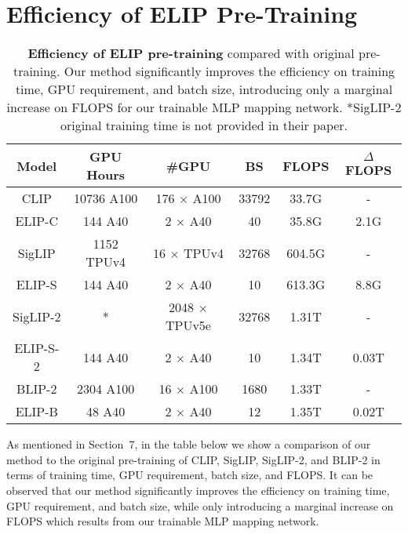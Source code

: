 \clearpage
\section{Efficiency of ELIP Pre-Training}
\label{sec:sup_efficiency}



\begin{table}[h]
    \centering
    \tabcolsep=0.7cm
    \begin{tabular}{cccccc}
    \toprule 
    Model & GPU Hours & \#GPU & BS & FLOPS & $\Delta$FLOPS \\
    \midrule

CLIP & 10736 A100 & 176 $\times$ A100 & 33792 &33.7G & -  \\
ELIP-C  & 144 A40 & 2 $\times$  A40 & 40 &35.8G & 2.1G \\
\midrule
SigLIP & 1152 TPUv4 & 16 $\times$ TPUv4 & 32768 & 604.5G & -    \\
ELIP-S & 144 A40 & 2 $\times$  A40 & 10 &613.3G & 8.8G   \\
\midrule
SigLIP-2 & * & 2048 $\times$ TPUv5e & 32768 &1.31T & -    \\
ELIP-S-2 & 144 A40 & 2 $\times$  A40 & 10 &1.34T &  0.03T   \\
\midrule
BLIP-2 & 2304 A100 & 16 $\times$  A100 & 1680 & 1.33T & -   \\
ELIP-B & 48 A40 & 2 $\times$ A40 & 12 &1.35T & 0.02T \\

    \bottomrule
    \end{tabular}
    \caption{\textbf{Efficiency of ELIP pre-training} compared with original pre-training. Our method significantly improves the efficiency on training time, GPU requirement, and batch size, introducing only a marginal increase on FLOPS for our trainable MLP mapping network. *SigLIP-2 original training time is not provided in their paper.}
    \label{tab:supple_efficiency}
\end{table}



As mentioned in Section~7, in the table below we show a comparison of our method to the original pre-training of CLIP, SigLIP, SigLIP-2, and BLIP-2 in terms of training time, GPU requirement, batch size, and FLOPS. It can be observed that our method significantly improves the efficiency on training time, GPU requirement, and batch size, while only introducing a marginal increase on FLOPS which results from our trainable MLP mapping network.
